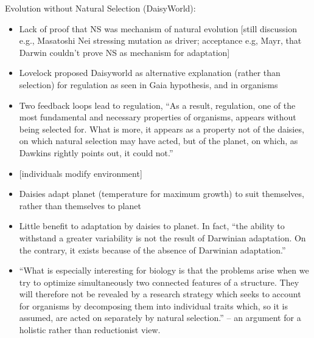 \autocite{Saunders1994} Evolution without Natural Selection (DaisyWorld):

\begin{itemize}
	\item
	
	Lack of proof that NS was mechanism of natural evolution {[}still
	discussion e.g., Masatoshi Nei stressing mutation as driver;
	acceptance e.g, Mayr, that Darwin couldn't prove NS as mechanism for
	adaptation{]}
	
	\item
	
	Lovelock proposed Daisyworld as alternative explanation (rather than
	selection) for regulation as seen in Gaia hypothesis, and in organisms
	
	\item
	
	Two feedback loops lead to regulation, ``As a result, regulation, one
	of the most fundamental and necessary properties of organisms, appears
	without being selected for. What is more, it appears as a property not
	of the daisies, on which natural selection may have acted, but of the
	planet, on which, as Dawkins rightly points out, it could not.''
	
	\item
	
	{[}individuals modify environment{]}
	
	\item
	
	Daisies adapt planet (temperature for maximum growth) to suit
	themselves, rather than themselves to planet
	
	\item
	
	Little benefit to adaptation by daisies to planet. In fact, ``the
	ability to withstand a greater variability is not the result of
	Darwinian adaptation. On the contrary, it exists because of the
	absence of Darwinian adaptation.''
	
	\item
	
	``What is especially interesting for biology is that the problems
	arise when we try to optimize simultaneously two connected features of
	a structure. They will therefore not be revealed by a research
	strategy which seeks to account for organisms by decomposing them into
	individual traits which, so it is assumed, are acted on separately by
	natural selection.'' -- an argument for a holistic rather than reductionist view.
	
\end{itemize}

